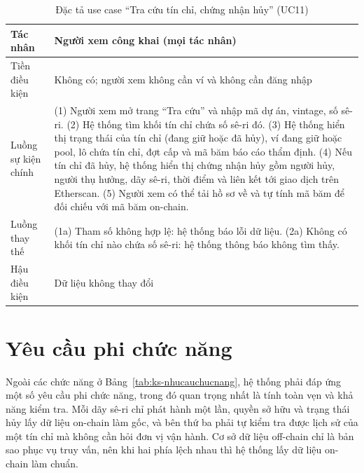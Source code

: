 \begin{table}[!htbp]
    \centering
    \caption{Đặc tả use case ``Tra cứu tín chỉ, chứng nhận hủy'' (UC11)}
    \label{tab:dt-uc11}
    \small
    \begin{tabularx}{\textwidth}{|L{2.8cm}|Y|}
        \hline
        Tác nhân & Người xem công khai (mọi tác nhân) \\
        \hline
        Tiền điều kiện & Không có; người xem không cần ví và không cần đăng nhập \\
        \hline
        Luồng sự kiện chính & (1) Người xem mở trang ``Tra cứu'' và nhập mã dự án, vintage, số sê-ri.\newline
        (2) Hệ thống tìm khối tín chỉ chứa số sê-ri đó.\newline
        (3) Hệ thống hiển thị trạng thái của tín chỉ (đang giữ hoặc đã hủy), ví đang giữ hoặc pool, lô chứa tín chỉ, đợt cấp và mã băm báo cáo thẩm định.\newline
        (4) Nếu tín chỉ đã hủy, hệ thống hiển thị chứng nhận hủy gồm người hủy, người thụ hưởng, dãy sê-ri, thời điểm và liên kết tới giao dịch trên Etherscan.\newline
        (5) Người xem có thể tải hồ sơ về và tự tính mã băm để đối chiếu với mã băm on-chain. \\
        \hline
        Luồng thay thế & (1a) Tham số không hợp lệ: hệ thống báo lỗi dữ liệu.\newline
        (2a) Không có khối tín chỉ nào chứa số sê-ri: hệ thống thông báo không tìm thấy. \\
        \hline
        Hậu điều kiện & Dữ liệu không thay đổi \\
        \hline
    \end{tabularx}
\end{table}

\FloatBarrier
\section{Yêu cầu phi chức năng}
\label{sec:phichucnang}
\label{subsec:ycphichucnang}

Ngoài các chức năng ở Bảng~\ref{tab:ks-nhucauchucnang}, hệ thống phải đáp ứng một số yêu cầu phi chức năng, trong đó quan trọng nhất là tính toàn vẹn và khả năng kiểm tra. Mỗi dãy sê-ri chỉ phát hành một lần, quyền sở hữu và trạng thái hủy lấy dữ liệu on-chain làm gốc, và bên thứ ba phải tự kiểm tra được lịch sử của một tín chỉ mà không cần hỏi đơn vị vận hành. Cơ sở dữ liệu off-chain chỉ là bản sao phục vụ truy vấn, nên khi hai phía lệch nhau thì hệ thống lấy dữ liệu on-chain làm chuẩn.


